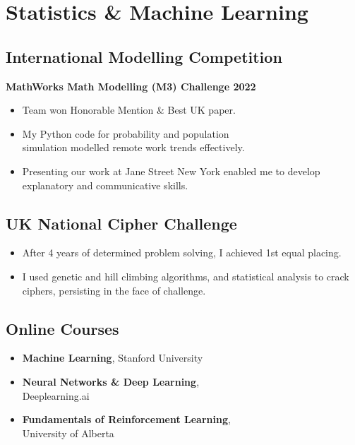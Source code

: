 \documentclass{Resume}
\begin{document}
	\section{Statistics \& Machine Learning}

		\subsection{International Modelling Competition}
			\textbf{MathWorks Math Modelling (M3) Challenge 2022} 
			\begin{itemize}
			    \item Team won Honorable Mention \& Best UK paper.
			    \item My Python code for probability and population \\ simulation modelled remote work trends effectively.
			    \item Presenting our work at Jane Street New York enabled me to develop explanatory and communicative skills.
			\end{itemize}

            \subsection{UK National Cipher Challenge}
		  \begin{itemize}
                \item After 4 years of determined problem solving, I achieved 1st equal placing.
                \item I used genetic and hill climbing algorithms, and statistical analysis to crack ciphers, persisting in the face of challenge.
            \end{itemize}
   			
		\subsection{Online Courses}
			\begin{itemize}[itemsep=1mm, parsep=0pt]
				\item \textbf{Machine Learning}, Stanford University
				\item \textbf{Neural Networks \& Deep Learning}, \\ Deeplearning.ai 
				\item \textbf{Fundamentals of Reinforcement Learning}, \\ University of Alberta
			\end{itemize}
\end{document}
